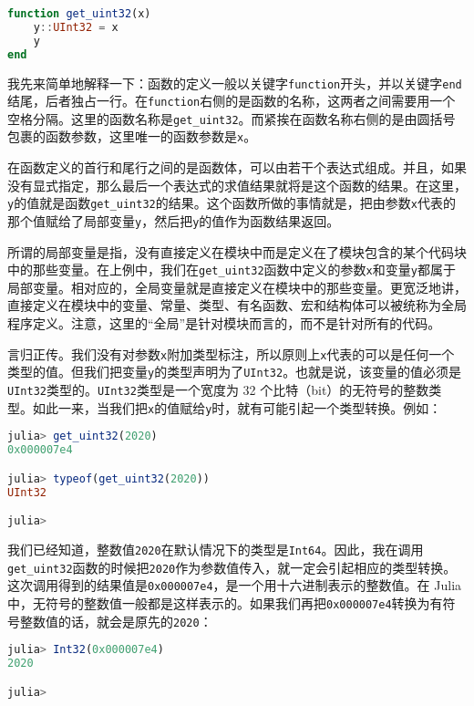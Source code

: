 \begin{lstlisting}[language=julia]
function get_uint32(x)
    y::UInt32 = x
    y
end
\end{lstlisting}

我先来简单地解释一下：函数的定义一般以关键字\verb|function|开头，并以关键字\verb|end|结尾，后者独占一行。在\verb|function|右侧的是函数的名称，这两者之间需要用一个空格分隔。这里的函数名称是\verb|get_uint32|。而紧挨在函数名称右侧的是由圆括号包裹的函数参数，这里唯一的函数参数是\verb|x|。

在函数定义的首行和尾行之间的是函数体，可以由若干个表达式组成。并且，如果没有显式指定，那么最后一个表达式的求值结果就将是这个函数的结果。在这里，\verb|y|的值就是函数\verb|get_uint32|的结果。这个函数所做的事情就是，把由参数\verb|x|代表的那个值赋给了局部变量\verb|y|，然后把\verb|y|的值作为函数结果返回。

所谓的局部变量是指，没有直接定义在模块中而是定义在了模块包含的某个代码块中的那些变量。在上例中，我们在\verb|get_uint32|函数中定义的参数\verb|x|和变量\verb|y|都属于局部变量。相对应的，全局变量就是直接定义在模块中的那些变量。更宽泛地讲，直接定义在模块中的变量、常量、类型、有名函数、宏和结构体可以被统称为全局程序定义。注意，这里的“全局”是针对模块而言的，而不是针对所有的代码。

言归正传。我们没有对参数\verb|x|附加类型标注，所以原则上\verb|x|代表的可以是任何一个类型的值。但我们把变量\verb|y|的类型声明为了\verb|UInt32|。也就是说，该变量的值必须是\verb|UInt32|类型的。\verb|UInt32|类型是一个宽度为 32 个比特（bit）的无符号的整数类型。如此一来，当我们把\verb|x|的值赋给\verb|y|时，就有可能引起一个类型转换。例如：

\begin{lstlisting}[language=julia]
julia> get_uint32(2020)
0x000007e4

julia> typeof(get_uint32(2020))
UInt32

julia> 
\end{lstlisting}

我们已经知道，整数值\verb|2020|在默认情况下的类型是\verb|Int64|。因此，我在调用\verb|get_uint32|函数的时候把\verb|2020|作为参数值传入，就一定会引起相应的类型转换。这次调用得到的结果值是\verb|0x000007e4|，是一个用十六进制表示的整数值。在 Julia 中，无符号的整数值一般都是这样表示的。如果我们再把\verb|0x000007e4|转换为有符号整数值的话，就会是原先的\verb|2020|：

\begin{lstlisting}[language=julia]
julia> Int32(0x000007e4)
2020

julia> 
\end{lstlisting}

